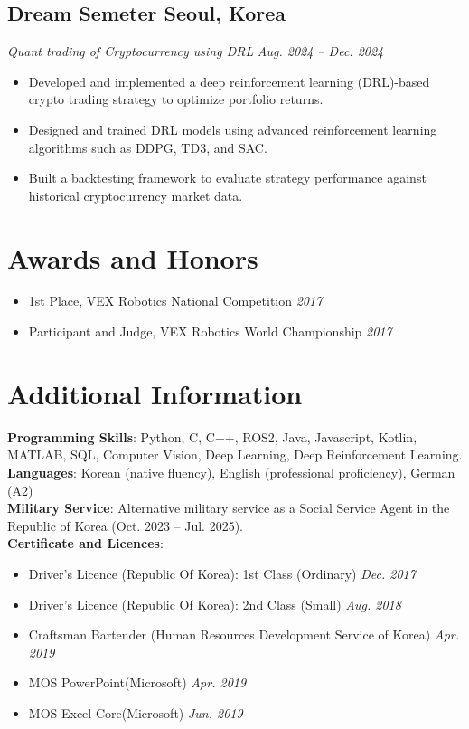 \documentclass[11pt,a4paper]{article}
\begin{document}
\subsection*{\textbf{Dream Semeter} \hfill Seoul, Korea}
\textit{Quant trading of Cryptocurrency using DRL} \hfill \textit{Aug. 2024 – Dec. 2024}
\begin{itemize}
    \item Developed and implemented a deep reinforcement learning (DRL)-based crypto trading strategy to optimize portfolio returns.
    \item Designed and trained DRL models using advanced reinforcement learning algorithms such as DDPG, TD3, and SAC.
    \item Built a backtesting framework to evaluate strategy performance against historical cryptocurrency market data.
\end{itemize}

\section*{Awards and Honors}
\begin{itemize}
    \item 1st Place, VEX Robotics National Competition \hfill \textit{2017}
    \item Participant and Judge, VEX Robotics World Championship \hfill \textit{2017}
\end{itemize}

\section*{Additional Information}
\textbf{Programming Skills}: Python, C, C++, ROS2, Java, Javascript, Kotlin, MATLAB, SQL, Computer Vision, Deep Learning, Deep Reinforcement Learning. \\
\textbf{Languages}: Korean (native fluency), English (professional proficiency), German (A2) \\
\textbf{Military Service}: Alternative military service as a Social Service Agent in the Republic of Korea (Oct. 2023 – Jul. 2025). \\
\textbf{Certificate and Licences}:
\begin{itemize}
	\item Driver's Licence (Republic Of Korea): 1st Class (Ordinary) \hfill \textit{Dec. 2017}
	\item Driver's Licence (Republic Of Korea): 2nd Class (Small) \hfill \textit{Aug. 2018}
	\item Craftsman Bartender (Human Resources Development Service of Korea) \hfill \textit{Apr. 2019}
	\item MOS PowerPoint(Microsoft) \hfill \textit{Apr. 2019}
	\item MOS Excel Core(Microsoft) \hfill \textit{Jun. 2019}
\end{itemize}
\end{document}
